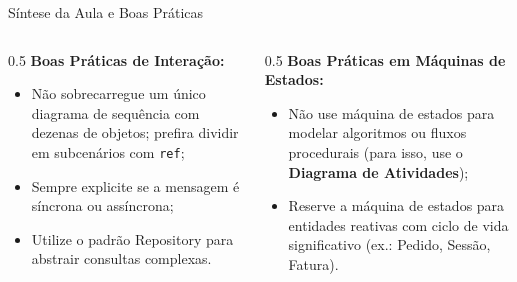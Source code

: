 \documentclass[10pt]{beamer}
\begin{document}
\begin{frame}{Síntese da Aula e Boas Práticas}
    \begin{columns}
        \begin{column}{0.5\textwidth}
            \textbf{Boas Práticas de Interação:}
            \begin{itemize}
                \item Não sobrecarregue um único diagrama de sequência com dezenas de objetos; prefira dividir em subcenários com \texttt{ref};
                \item Sempre explicite se a mensagem é síncrona ou assíncrona;
                \item Utilize o padrão Repository para abstrair consultas complexas.
            \end{itemize}
        \end{column}
        \begin{column}{0.5\textwidth}
            \textbf{Boas Práticas em Máquinas de Estados:}
            \begin{itemize}
                \item Não use máquina de estados para modelar algoritmos ou fluxos procedurais (para isso, use o \textbf{Diagrama de Atividades});
                \item Reserve a máquina de estados para entidades reativas com ciclo de vida significativo (ex.: Pedido, Sessão, Fatura).
            \end{itemize}
        \end{column}
    \end{columns}
\end{frame}
\end{document}
